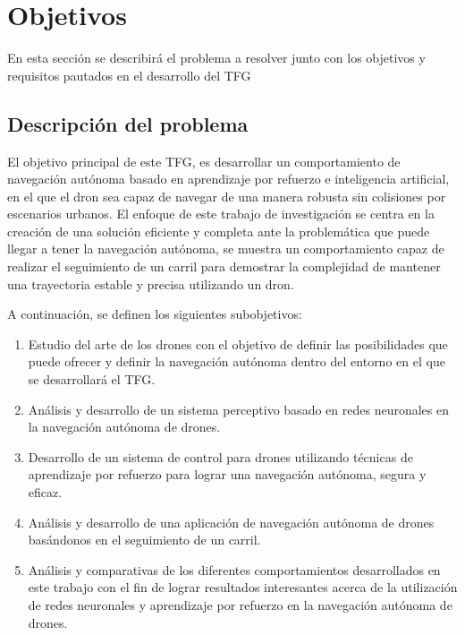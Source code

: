 \chapter{Objetivos}
\label{cap:capitulo2}

En esta sección se describirá el problema a resolver junto con los objetivos y requisitos pautados en el desarrollo del TFG

\section{Descripción del problema}
\label{sec:descripcion}

El objetivo principal de este TFG, es desarrollar un comportamiento de navegación autónoma basado en 
aprendizaje por refuerzo e inteligencia artificial, en el que el dron sea capaz de navegar de una manera robusta sin colisiones por escenarios urbanos. El enfoque de este trabajo de investigación 
se centra en la creación de una solución eficiente y completa ante la problemática que puede llegar a tener la navegación autónoma, se 
muestra un comportamiento capaz de realizar el seguimiento de un carril para demostrar la complejidad de mantener una trayectoria estable 
y precisa utilizando un dron. 

A continuación, se definen los siguientes subobjetivos: 

\begin{enumerate}
    \item Estudio del arte de los drones con el objetivo de definir las posibilidades que puede ofrecer y definir 
    la navegación autónoma dentro del entorno en el que se desarrollará el TFG. 
    \item Análisis y desarrollo de un sistema perceptivo basado en redes neuronales en la navegación autónoma de drones.
    \item Desarrollo  de un sistema de control para drones utilizando técnicas de aprendizaje por refuerzo para lograr una navegación 
    autónoma, segura y eficaz.
    \item Análisis y desarrollo de una aplicación de navegación autónoma de drones basándonos en el seguimiento de un carril.
    \item Análisis y comparativas de los diferentes comportamientos desarrollados en este trabajo con el fin de 
    lograr resultados interesantes acerca de la utilización de redes neuronales y aprendizaje por refuerzo en la navegación autónoma de drones.
\end{enumerate}
\newpage
